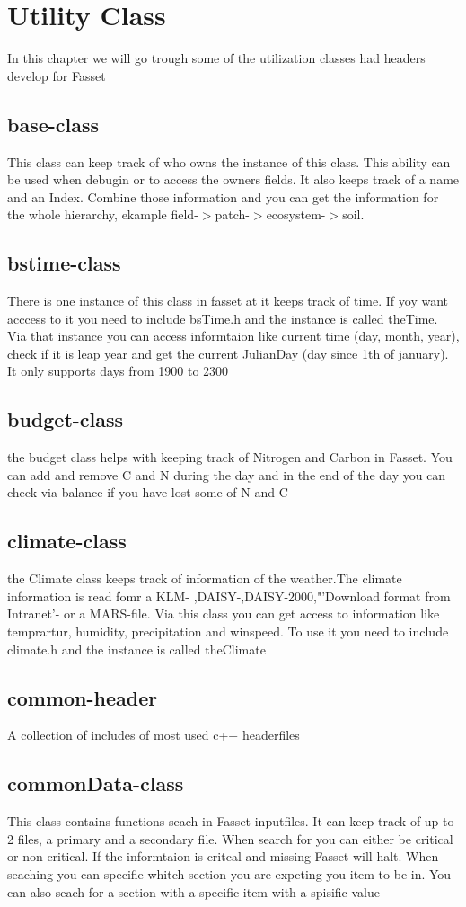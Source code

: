 \chapter{Utility Class}
In this chapter we will go trough some of the utilization classes had headers develop for Fasset
\section{base-class}
This class can keep track of who owns the instance of this class. This ability can be used when debugin or to access the owners fields. It also keeps track of a name and an Index. Combine those information and you can get the information for the whole hierarchy, ekample field-$>$patch-$>$ecosystem-$>$soil.
\section{bstime-class}
There is one instance of this class in fasset at it keeps track of time. If yoy want acccess to it you need to include bsTime.h and the instance is called theTime. Via that instance you can access informtaion like current time (day, month, year), check if it is leap year and get the current JulianDay (day since 1th of january). It only supports days from 1900 to 2300
\section{budget-class}
the budget class helps with keeping track of Nitrogen and Carbon in Fasset. You can add and remove C and N during the day and in the end of the day you can check via balance if you have lost some of N and C
\section{climate-class}
the Climate class keeps track of information of the weather.The climate information is read fomr a KLM- ,DAISY-,DAISY-2000,"'Download format from Intranet'- or a MARS-file. Via this class you can get access to information like temprartur, humidity, precipitation and winspeed. To use it you need to include climate.h and the instance is called theClimate
\section{common-header}
A collection of includes of most used c++ headerfiles
\section{commonData-class}
This class contains functions seach in Fasset inputfiles. It can keep track of up to 2 files, a primary and a secondary file. When search for you can either be critical or non critical. If the informtaion is critcal and missing Fasset will halt. When seaching you can specifie whitch section you are expeting you item to be in. You can also seach for a section with a specific item with a spisific value
